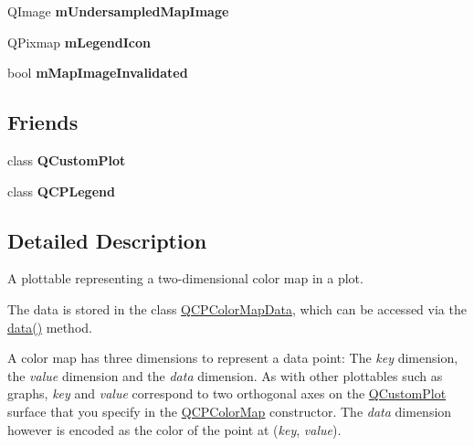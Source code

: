 \begin{DoxyCompactItemize}
\item 
Q\+Image {\bfseries m\+Undersampled\+Map\+Image}\hypertarget{class_q_c_p_color_map_acad3d52f3572436d5f2e4057911ea8d3}{}\label{class_q_c_p_color_map_acad3d52f3572436d5f2e4057911ea8d3}

\item 
Q\+Pixmap {\bfseries m\+Legend\+Icon}\hypertarget{class_q_c_p_color_map_ada522988db02cb531767d38c5029ef60}{}\label{class_q_c_p_color_map_ada522988db02cb531767d38c5029ef60}

\item 
bool {\bfseries m\+Map\+Image\+Invalidated}\hypertarget{class_q_c_p_color_map_ac9aea6a5c193d7fa866bc7b26e79ef2c}{}\label{class_q_c_p_color_map_ac9aea6a5c193d7fa866bc7b26e79ef2c}

\end{DoxyCompactItemize}
\subsection*{Friends}
\begin{DoxyCompactItemize}
\item 
class {\bfseries Q\+Custom\+Plot}\hypertarget{class_q_c_p_color_map_a00f8b42d059625f815808a7cc99c2f04}{}\label{class_q_c_p_color_map_a00f8b42d059625f815808a7cc99c2f04}

\item 
class {\bfseries Q\+C\+P\+Legend}\hypertarget{class_q_c_p_color_map_a6dddb88f268bc26693c552bbb68acbb5}{}\label{class_q_c_p_color_map_a6dddb88f268bc26693c552bbb68acbb5}

\end{DoxyCompactItemize}


\subsection{Detailed Description}
A plottable representing a two-\/dimensional color map in a plot. 



The data is stored in the class \hyperlink{class_q_c_p_color_map_data}{Q\+C\+P\+Color\+Map\+Data}, which can be accessed via the \hyperlink{class_q_c_p_color_map_a3ae12c9ce842352037cd20ea5267414f}{data()} method.

A color map has three dimensions to represent a data point\+: The {\itshape key} dimension, the {\itshape value} dimension and the {\itshape data} dimension. As with other plottables such as graphs, {\itshape key} and {\itshape value} correspond to two orthogonal axes on the \hyperlink{class_q_custom_plot}{Q\+Custom\+Plot} surface that you specify in the \hyperlink{class_q_c_p_color_map}{Q\+C\+P\+Color\+Map} constructor. The {\itshape data} dimension however is encoded as the color of the point at ({\itshape key}, {\itshape value}).

